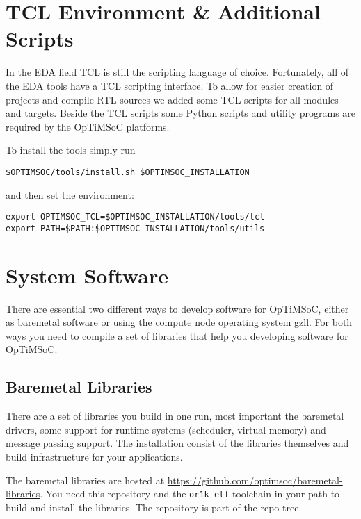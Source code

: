 \section{TCL Environment \& Additional Scripts}

In the EDA field TCL is still the scripting language of choice.
Fortunately, all of the EDA tools have a TCL scripting interface. To
allow for easier creation of projects and compile RTL sources we added
some TCL scripts for all modules and targets. Beside the TCL scripts
some Python scripts and utility programs are required by the OpTiMSoC
platforms.

To install the tools simply run

\begin{lstlisting}
$OPTIMSOC/tools/install.sh $OPTIMSOC_INSTALLATION
\end{lstlisting}

and then set the environment:

\begin{lstlisting}
export OPTIMSOC_TCL=$OPTIMSOC_INSTALLATION/tools/tcl
export PATH=$PATH:$OPTIMSOC_INSTALLATION/tools/utils
\end{lstlisting}

\section{System Software}

There are essential two different ways to develop software for
OpTiMSoC, either as baremetal software or using the compute node
operating system gzll. For both ways you need to compile a set of
libraries that help you developing software for OpTiMSoC.

\subsection{Baremetal Libraries}

There are a set of libraries you build in one run, most important the
baremetal drivers, some support for runtime systems (scheduler,
virtual memory) and message passing support. The installation consist
of the libraries themselves and build infrastructure for your
applications.

The baremetal libraries are hosted at
\url{https://github.com/optimsoc/baremetal-libraries}. You need this
repository and the \verb|or1k-elf| toolchain in your path to build and
install the libraries. The repository is part of the repo tree.

